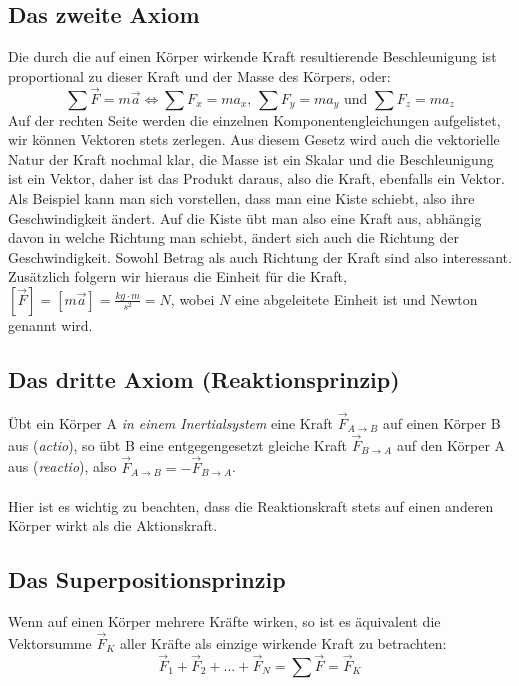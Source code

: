 \documentclass[11pt]{article}
\begin{document}
\subsection{Das zweite Axiom}
Die durch die auf einen Körper wirkende Kraft resultierende Beschleunigung ist proportional zu dieser Kraft und der Masse des Körpers, oder: 
\begin{equation*}
    \sum \vec{F} = m\vec{a} \iff \sum F_x = ma_x \text{, } \sum F_y = ma_y \text{ und } \sum F_z = ma_z
\end{equation*}
Auf der rechten Seite werden die einzelnen Komponentengleichungen aufgelistet, wir können Vektoren stets zerlegen. Aus diesem Gesetz wird auch die vektorielle Natur der Kraft nochmal klar, die Masse ist ein Skalar und die Beschleunigung ist ein Vektor, daher ist das Produkt daraus, also die Kraft, ebenfalls ein Vektor. Als Beispiel kann man sich vorstellen, dass man eine Kiste schiebt, also ihre Geschwindigkeit ändert. Auf die Kiste übt man also eine Kraft aus, abhängig davon in welche Richtung man schiebt, ändert sich auch die Richtung der Geschwindigkeit. Sowohl Betrag als auch Richtung der Kraft sind also interessant. \\
Zusätzlich folgern wir hieraus die Einheit für die Kraft, $\displaystyle [\vec{F}] = [m\vec{a}] = \frac{kg\cdot m}{s^2} = N$, wobei $N$ eine abgeleitete Einheit ist und Newton genannt wird. 

\subsection{Das dritte Axiom (Reaktionsprinzip)}
Übt ein Körper A \textit{in einem Inertialsystem} eine Kraft $\vec{F}_{A\rightarrow B}$ auf einen Körper B aus (\textit{actio}), so übt B eine entgegengesetzt gleiche Kraft $\vec{F}_{B \rightarrow A}$ auf den Körper A aus (\textit{reactio}), also $\vec{F}_{A\rightarrow B} = - \vec{F}_{B \rightarrow A}$. \\\\
Hier ist es wichtig zu beachten, dass die Reaktionskraft stets auf einen anderen Körper wirkt als die Aktionskraft. 

\subsection{Das Superpositionsprinzip}
Wenn auf einen Körper mehrere Kräfte wirken, so ist es äquivalent die Vektorsumme $\vec{F}_K$ aller Kräfte als einzige wirkende Kraft zu betrachten: 
\begin{equation*}
    \vec{F}_1 + \vec{F}_2 + ... + \vec{F}_N = \sum \vec{F} = \vec{F}_K
\end{equation*}
\end{document}
